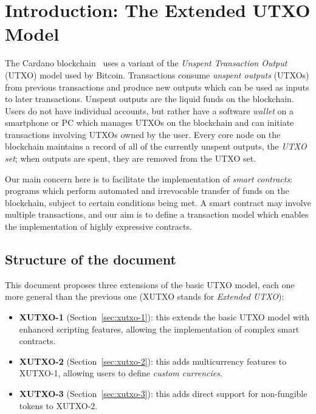 \documentclass[a4paper]{article}
\theoremstyle{definition}  %
\begin{document}
\maketitle

\section{Introduction: The Extended UTXO Model}
\label{sec:intro}
The Cardano blockchain~\cite{Cardano} uses a variant of the \textit{Unspent
  Transaction Output} (UTXO) model used by Bitcoin.  Transactions
consume \textit{unspent outputs} (UTXOs) from previous transactions
and produce new outputs which can be used as inputs to later
transactions.  Unspent outputs are the liquid funds on the
blockchain. Users do not have individual accounts, but rather have a
software \textit{wallet} on a smartphone or PC which manages UTXOs on
the blockchain and can initiate transactions involving UTXOs owned by
the user.  Every core node on the blockchain maintains a record of all
of the currently unspent outputs, the \textit{UTXO set}; when outputs
are spent, they are removed from the UTXO set.

Our main concern here is to facilitate the implementation of
\textit{smart contracts}: programs which perform automated and
irrevocable transfer of funds on the blockchain, subject to certain
conditions being met.  A smart contract may involve multiple
transactions, and our aim is to define a transaction model which
enables the implementation of highly expressive contracts.

\subsection{Structure of the document}
\label{sec:doc-structure}
This document proposes three extensions of the basic UTXO model, each
one more general than the previous one (XUTXO stands for
\textit{Extended UTXO}):

\begin{itemize}
  \item \textbf{XUTXO-1} (Section~\ref{sec:xutxo-1}): this extends the
    basic UTXO model with enhanced scripting features, allowing the
    implementation of complex smart contracts.
  \item \textbf{XUTXO-2} (Section~\ref{sec:xutxo-2}): this adds
    multicurrency features to XUTXO-1, allowing users to define
    \textit{custom currencies}.
  \item \textbf{XUTXO-3} (Section~\ref{sec:xutxo-3}): this adds direct
    support for non-fungible tokens to XUTXO-2.
\end{itemize}
\end{document}
